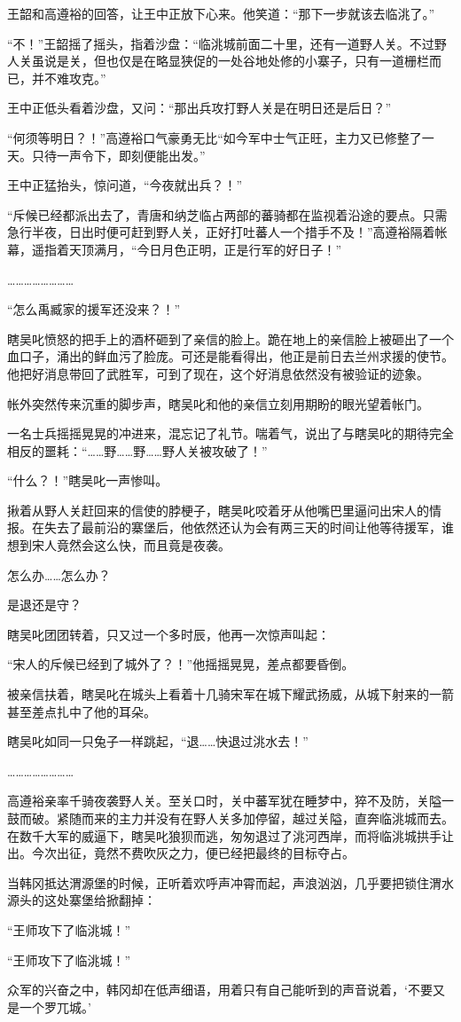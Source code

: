 王韶和高遵裕的回答，让王中正放下心来。他笑道：“那下一步就该去临洮了。”

“不！”王韶摇了摇头，指着沙盘：“临洮城前面二十里，还有一道野人关。不过野人关虽说是关，但也仅是在略显狭促的一处谷地处修的小寨子，只有一道栅栏而已，并不难攻克。”

王中正低头看着沙盘，又问：“那出兵攻打野人关是在明日还是后日？”

“何须等明日？！”高遵裕口气豪勇无比“如今军中士气正旺，主力又已修整了一天。只待一声令下，即刻便能出发。”

王中正猛抬头，惊问道，“今夜就出兵？！”

“斥候已经都派出去了，青唐和纳芝临占两部的蕃骑都在监视着沿途的要点。只需急行半夜，日出时便可赶到野人关，正好打吐蕃人一个措手不及！”高遵裕隔着帐幕，遥指着天顶满月，“今日月色正明，正是行军的好日子！”

……………………

“怎么禹臧家的援军还没来？！”

瞎吴叱愤怒的把手上的酒杯砸到了亲信的脸上。跪在地上的亲信脸上被砸出了一个血口子，涌出的鲜血污了脸庞。可还是能看得出，他正是前日去兰州求援的使节。他把好消息带回了武胜军，可到了现在，这个好消息依然没有被验证的迹象。

帐外突然传来沉重的脚步声，瞎吴叱和他的亲信立刻用期盼的眼光望着帐门。

一名士兵摇摇晃晃的冲进来，混忘记了礼节。喘着气，说出了与瞎吴叱的期待完全相反的噩耗：“……野……野……野人关被攻破了！”

“什么？！”瞎吴叱一声惨叫。

揪着从野人关赶回来的信使的脖梗子，瞎吴叱咬着牙从他嘴巴里逼问出宋人的情报。在失去了最前沿的寨堡后，他依然还认为会有两三天的时间让他等待援军，谁想到宋人竟然会这么快，而且竟是夜袭。

怎么办……怎么办？

是退还是守？

瞎吴叱团团转着，只又过一个多时辰，他再一次惊声叫起：

“宋人的斥候已经到了城外了？！”他摇摇晃晃，差点都要昏倒。

被亲信扶着，瞎吴叱在城头上看着十几骑宋军在城下耀武扬威，从城下射来的一箭甚至差点扎中了他的耳朵。

瞎吴叱如同一只兔子一样跳起，“退……快退过洮水去！”

……………………

高遵裕亲率千骑夜袭野人关。至关口时，关中蕃军犹在睡梦中，猝不及防，关隘一鼓而破。紧随而来的主力并没有在野人关多加停留，越过关隘，直奔临洮城而去。在数千大军的威逼下，瞎吴叱狼狈而逃，匆匆退过了洮河西岸，而将临洮城拱手让出。今次出征，竟然不费吹灰之力，便已经把最终的目标夺占。

当韩冈抵达渭源堡的时候，正听着欢呼声冲霄而起，声浪汹汹，几乎要把锁住渭水源头的这处寨堡给掀翻掉：

“王师攻下了临洮城！”

“王师攻下了临洮城！”

众军的兴奋之中，韩冈却在低声细语，用着只有自己能听到的声音说着，‘不要又是一个罗兀城。’


